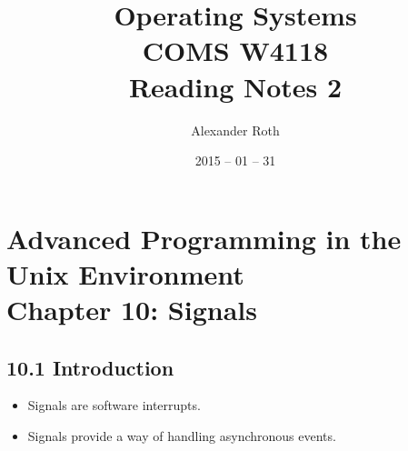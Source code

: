 \documentclass[]{article}
\begin{document}
\newtheorem{thm}{Theorem}
\title{Operating Systems \\ COMS W4118 \\ Reading Notes 2}
\author{Alexander Roth}
\date{2015 -- 01 -- 31}
\maketitle

\section*{Advanced Programming in the Unix Environment \\
Chapter 10: Signals}
\subsection*{10.1 Introduction}
\begin{itemize}
\item Signals are software interrupts.
\item Signals provide a way of handling asynchronous events.
\end{itemize}
\end{document}

